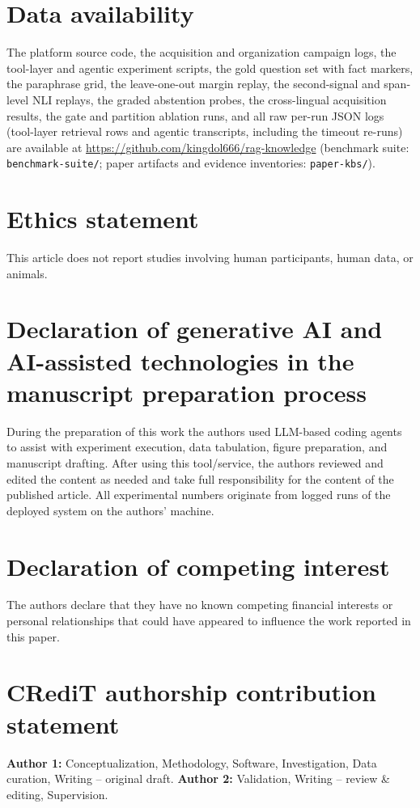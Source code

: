 \section*{Data availability}
The platform source code, the acquisition and organization campaign logs, the
tool-layer and agentic experiment scripts, the gold question set with fact
markers, the paraphrase grid, the leave-one-out margin replay, the
second-signal and span-level NLI replays, the graded abstention probes, the
cross-lingual acquisition results, the gate and partition ablation runs, and
all raw per-run JSON logs (tool-layer retrieval rows and agentic transcripts,
including the timeout re-runs) are available at
\url{https://github.com/kingdol666/rag-knowledge} (benchmark suite:
\texttt{benchmark-suite/}; paper artifacts and evidence inventories:
\texttt{paper-kbs/}).

\section*{Ethics statement}
This article does not report studies involving human participants, human
data, or animals.

\section*{Declaration of generative AI and AI-assisted technologies in the manuscript preparation process}
During the preparation of this work the authors used LLM-based coding
agents to assist with experiment execution, data tabulation, figure
preparation, and manuscript drafting. After using this tool/service, the
authors reviewed and edited the content as needed and take full
responsibility for the content of the published article. All experimental
numbers originate from logged runs of the deployed system on the authors'
machine.

\section*{Declaration of competing interest}
The authors declare that they have no known competing financial interests
or personal relationships that could have appeared to influence the work
reported in this paper.

\section*{CRediT authorship contribution statement}
\textbf{Author 1:} Conceptualization, Methodology, Software, Investigation,
Data curation, Writing -- original draft. \textbf{Author 2:} Validation,
Writing -- review \& editing, Supervision. %

